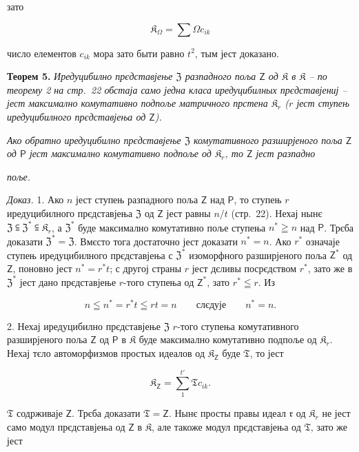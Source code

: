 \documentclass[11pt]{article}
\begin{document}
зато

\[
\mathfrak K_\Omega=\sum\Omega c_{ik}
\]

число елементов \(c_{ik}\) мора зато быти равно \(t^2\), тым јест доказано.

\textbf{Теорем 5.} \emph{Иредуцибилно прєдставјење \(\mathfrak Z\) разпадного поља \(\mathsf{Z}\) од \(\mathfrak K\) в \(\mathfrak K\) -- по теорему 2 на стр.~22 обстаја само једна класа иредуцибилных прєдставјениј -- јест максимално комутативно подпоље матричного прстена \(\mathfrak K_r\) (\(r\) јест ступењ иредуцибилного прєдставјења од \(\mathsf{Z}\)).}

\emph{Ако обратно иредуцибилно прєдставјење \(\mathfrak Z\) комутативного разширјеного поља \(\mathsf{Z}\) од \(\mathsf P\) јест максимално комутативно подпоље од \(\mathfrak K_r\), то \(\mathsf{Z}\) јест разпадно}

\emph{поље.}

\emph{Доказ.} 1. Ако \(n\) јест ступењ разпадного поља \(\mathsf{Z}\) над \(\mathsf P\), то ступењ \(r\) иредуцибилного прєдставјења \(\mathfrak Z\) од \(\mathsf{Z}\) јест равны \(n/t\) (стр.~22). Нехај нынє \(\mathfrak Z\subseteqq\mathfrak Z^*\subseteqq\mathfrak K_r\), а \(\mathfrak Z^*\) буде максимално комутативно поље ступења \(n^*\geqq n\) над \(\mathsf P\). Трєба доказати \(\mathfrak Z^*=\mathfrak Z\). Вмєсто тога достаточно јест доказати \(n^*=n\). Ако \(r^*\) означаје ступењ иредуцибилного прєдставјења с \(\mathfrak Z^*\) изоморфного разширјеного поља \(\mathsf{Z}^*\) од \(\mathsf{Z}\), поновно јест \(n^*=r^*t\); с другој страны \(r\) јест дєливы посрєдством \(r^*\), зато же в \(\mathfrak Z^*\) јест дано прєдставјење \(r\)-того ступења од \(\mathsf{Z}^*\), зато \(r^*\leqq r\). Из

\[
n\leqq n^*=r^*t\leqq rt=n \qquad\text{слєдује}\qquad n^*=n.
\]

2. Нехај иредуцибилно прєдставјење \(\mathfrak Z\) \(r\)-того ступења комутативного разширјеного поља \(\mathsf{Z}\) од \(\mathsf P\) в \(\mathfrak K\) буде максимално комутативно подпоље од \(\mathfrak K_r\). Нехај тєло автоморфизмов простых идеалов од \(\mathfrak K_{\mathsf{Z}}\) буде \(\mathfrak T\), то јест

\[
\mathfrak K_{\mathsf{Z}}=\sum_{1}^{t'}\mathfrak T c_{ik}.
\]

\(\mathfrak T\) содрживаје \(\mathsf{Z}\). Трєба доказати \(\mathfrak T=\mathsf{Z}\). Нынє просты правы идеал \(\mathfrak r\) од \(\mathfrak K_r\) не јест само модул прєдставјења од \(\mathsf{Z}\) в \(\mathfrak K\), але такоже модул прєдставјења од \(\mathfrak T\), зато же јест
\end{document}

